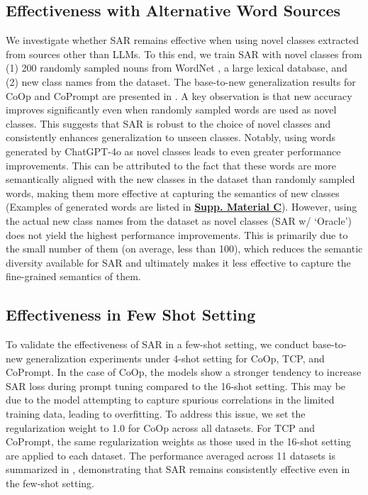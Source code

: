 \subsection{Effectiveness with Alternative Word Sources}
We investigate whether SAR remains effective when using novel classes extracted from sources other than LLMs. To this end, we train SAR with novel classes from (1) 200 randomly sampled nouns from WordNet \cite{miller1995wordnet}, a large lexical database, and (2) new class names from the dataset. The base-to-new generalization results for CoOp and CoPrompt are presented in . A key observation is that new accuracy improves significantly even when randomly sampled words are used as novel classes. This suggests that SAR is robust to the choice of novel classes and consistently enhances generalization to unseen classes. Notably, using words generated by ChatGPT-4o as novel classes leads to even greater performance improvements. This can be attributed to the fact that these words are more semantically aligned with the new classes in the dataset than randomly sampled words, making them more effective at capturing the semantics of new classes (Examples of generated words are listed in \underline{\textbf{Supp. Material C}}). However, using the actual new class names from the dataset as novel classes (SAR w/ `Oracle') does not yield the highest performance improvements. This is primarily due to the small number of them (on average, less than 100), which reduces the semantic diversity available for SAR and ultimately makes it less effective to capture the fine-grained semantics of them.

\subsection{Effectiveness in Few Shot Setting}
To validate the effectiveness of SAR in a few-shot setting, we conduct base-to-new generalization experiments under 4-shot setting for CoOp, TCP, and CoPrompt. In the case of CoOp, the models show a stronger tendency to increase SAR loss during prompt tuning compared to the 16-shot setting. This may be due to the model attempting to capture spurious correlations in the limited training data, leading to overfitting. To address this issue, we set the regularization weight to 1.0 for CoOp across all datasets. For TCP and CoPrompt, the same regularization weights as those used in the 16-shot setting are applied to each dataset. The performance averaged across 11 datasets is summarized in , demonstrating that SAR remains consistently effective even in the few-shot setting.

